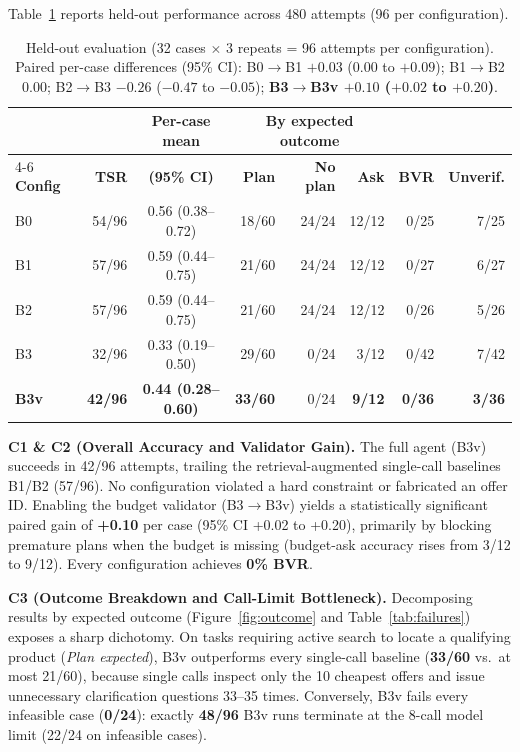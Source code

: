 \documentclass[10pt,letterpaper,twocolumn]{article}
\begin{document}
Table~\ref{tab:heldout} reports held-out performance across 480 attempts (96 per configuration).

\begin{table}[t]
\centering\small
\caption{Held-out evaluation (32 cases $\times$ 3 repeats = 96 attempts per configuration). Paired per-case differences (95\% CI): B0$\rightarrow$B1 $+0.03$ ($0.00$ to $+0.09$); B1$\rightarrow$B2 $0.00$; B2$\rightarrow$B3 $-0.26$ ($-0.47$ to $-0.05$); \textbf{B3$\rightarrow$B3v $+0.10$ ($+0.02$ to $+0.20$)}.}\label{tab:heldout}
\renewcommand{\arraystretch}{1.12}
\setlength{\tabcolsep}{7pt}
\begin{tabular}{@{}l r c r r r r r@{}}
\toprule
& & \textbf{Per-case mean} & \multicolumn{3}{c}{\textbf{By expected outcome}} & & \\
\cmidrule(lr){4-6}
\textbf{Config} & \textbf{TSR} & \textbf{(95\% CI)} & \textbf{Plan} & \textbf{No plan} & \textbf{Ask} & \textbf{BVR} & \textbf{Unverif.} \\
\midrule
B0 & 54/96 & 0.56 (0.38--0.72) & 18/60 & 24/24 & 12/12 & 0/25 & 7/25 \\
B1 & 57/96 & 0.59 (0.44--0.75) & 21/60 & 24/24 & 12/12 & 0/27 & 6/27 \\
B2 & 57/96 & 0.59 (0.44--0.75) & 21/60 & 24/24 & 12/12 & 0/26 & 5/26 \\
B3 & 32/96 & 0.33 (0.19--0.50) & 29/60 & 0/24 & 3/12 & 0/42 & 7/42 \\
\rowcolor{RowTint}\textbf{B3v} & \textbf{42/96} & \textbf{0.44 (0.28--0.60)} & \textbf{33/60} & 0/24 & \textbf{9/12} & \textbf{0/36} & \textbf{3/36} \\
\bottomrule
\end{tabular}
\end{table}

\textbf{C1 \& C2 (Overall Accuracy and Validator Gain).} The full agent (B3v) succeeds in 42/96 attempts, trailing the
retrieval-augmented single-call baselines B1/B2 (57/96). No configuration violated a hard constraint or fabricated an
offer ID. Enabling the budget validator (B3$\rightarrow$B3v) yields a statistically significant paired gain of
\textbf{+0.10} per case (95\% CI +0.02 to +0.20), primarily by blocking premature plans when the budget is missing
(budget-ask accuracy rises from 3/12 to 9/12). Every configuration achieves \textbf{0\% BVR}.

\textbf{C3 (Outcome Breakdown and Call-Limit Bottleneck).} Decomposing results by expected outcome (Figure~\ref{fig:outcome}
and Table~\ref{tab:failures}) exposes a sharp dichotomy. On tasks requiring active search to locate a qualifying product
(\emph{Plan expected}), B3v outperforms every single-call baseline (\textbf{33/60} vs.\ at most 21/60), because single
calls inspect only the 10 cheapest offers and issue unnecessary clarification questions 33--35 times. Conversely, B3v
fails every infeasible case (\textbf{0/24}): exactly \textbf{48/96} B3v runs terminate at the 8-call model limit
(22/24 on infeasible cases).
\end{document}
